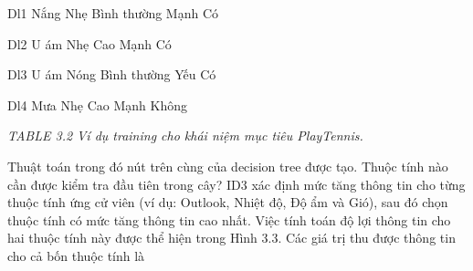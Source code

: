 Dl1 Nắng Nhẹ Bình thường Mạnh Có

Dl2 U ám Nhẹ Cao Mạnh Có

Dl3 U ám Nóng Bình thường Yếu Có

Dl4 Mưa Nhẹ Cao Mạnh Không

\noindent\textit{TABLE 3.2 Ví dụ training cho khái niệm mục tiêu PlayTennis.}

Thuật toán trong đó nút trên cùng của decision tree được tạo. Thuộc tính nào cần được kiểm tra đầu tiên trong cây? ID3 xác định mức tăng thông tin cho từng thuộc tính ứng cử viên (ví dụ: Outlook, Nhiệt độ, Độ ẩm và Gió), sau đó chọn thuộc tính có mức tăng thông tin cao nhất. Việc tính toán độ lợi thông tin cho hai thuộc tính này được thể hiện trong Hình 3.3. Các giá trị thu được thông tin cho cả bốn thuộc tính là

